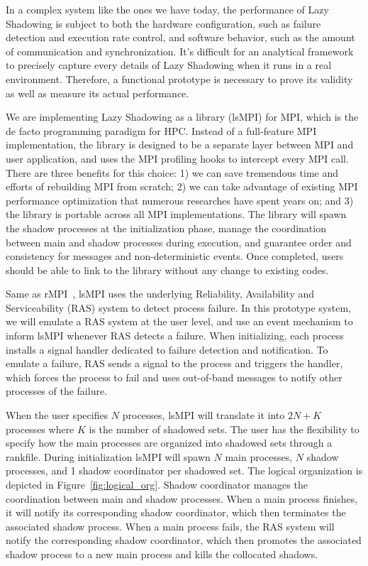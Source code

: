 In a complex system like the ones we have today, the performance of Lazy Shadowing is subject to both the hardware configuration, such as failure detection and execution rate control, and software behavior, such as the amount of communication and synchronization. 
It's difficult for an analytical framework to precisely capture every details of Lazy Shadowing when it runs in a real environment. Therefore, a functional prototype is necessary to prove its validity as well as measure its actual performance. 

We are implementing Lazy Shadowing as a library (lsMPI) for MPI, which is the de facto programming paradigm for HPC. Instead of a full-feature MPI implementation, the library is designed to be a separate layer between MPI and user application, and uses the MPI profiling hooks to intercept every MPI call. There are three benefits for this choice: 1) we can save tremendous time and efforts of rebuilding MPI from scratch; 2) we can take advantage of existing MPI performance optimization that numerous researches have spent years on; and 3) the library is portable across all MPI implementations. 
The library will spawn the shadow processes at the initialization phase, manage the coordination between main and shadow processes during execution, and guarantee order and consistency for messages and non-deterministic events.
Once completed, users should be able to link to the library without any change to existing codes. 

Same as rMPI~\cite{ferreira_sc_2011}, lsMPI uses the underlying Reliability, Availability and Serviceability (RAS) system to detect process failure. In this prototype system, we will emulate a RAS system at the user level, and use an event mechanism to inform lsMPI whenever RAS detects a failure. When initializing, each process installs a signal handler dedicated to failure detection and notification. To emulate a failure, RAS sends a signal to the process and triggers the handler, which forces the process to fail and uses out-of-band messages to notify other processes of the failure. 

When the user specifies $N$ processes, lsMPI will translate it into $2N + K$ processes where $K$ is the number of shadowed sets. The user has the flexibility to specify how the main processes are organized into shadowed sets through a rankfile. During initialization lsMPI will spawn $N$ main processes, $N$ shadow processes, and 1 shadow coordinator per shadowed set. The logical organization is depicted in Figure~\ref{fig:logical_org}. Shadow coordinator manages the coordination between main and shadow processes. When a main process finishes, it will notify its corresponding shadow coordinator, which then terminates the associated shadow process. When a main process fails, the RAS system will notify the corresponding shadow coordinator, which then promotes the associated shadow process to a new main process and kills the collocated shadows.

